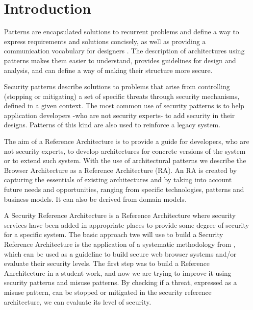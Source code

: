 \documentclass{sig-alternate-05-2015}
\begin{document}





\section*{Introduction}
Patterns are encapsulated solutions to recurrent problems and define a way to express requirements and solutions concisely, as well as providing a communication vocabulary for designers \cite{gamma1994design}. The description of architectures using patterns makes them easier to understand, provides guidelines for design and analysis, and can define a way of making their structure more secure.

Security patterns describe solutions to problems that arise from controlling (stopping or mitigating) a set of specific threats through security mechanisms, defined in a given context. The most common use of security patterns is to help application developers -who are not security experts- to add security in their designs. Patterns of this kind are also used to reinforce a legacy system.

The aim of a Reference Architecture is to provide a guide for developers, who are not security experts, to develop architectures for concrete versions of the system or to extend such system. With the use of architectural patterns we describe the Browser Architecture as a Reference Architecture (RA). An RA is created by capturing the essentials of existing architectures and by taking into account future needs and opportunities, ranging from specific technologies, patterns and business models. It can also be derived from domain models.

A Security Reference Architecture is a Reference Architecture where security services have been added in appropriate places to provide some degree of security for a specific system. The basic approach twe will use to build a Security Reference Architecture is the application of a systematic methodology from \cite{fernandez2006methodology,Fernandez2011,fernandez2014security}, which can be used as a guideline to build secure web browser systems and/or evaluate their security levels. The first step was to build a Reference Anrchitecture in a student work, and now we are trying to improve it using security patterns and misuse patterns. By checking if a threat, expressed as a misuse pattern, can be stopped or mitigated in the security reference architecture, we can evaluate its level of security.
\end{document}
